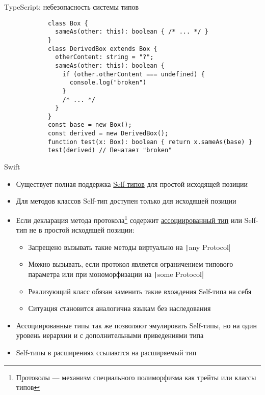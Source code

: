 \documentclass[aspectratio=169,usenames,dvipsnames]{beamer}
\begin{document}
    \begin{frame}[fragile]{TypeScript: небезопасность системы типов}
        \begin{verbatim}
            class Box {
              sameAs(other: this): boolean { /* ... */ }
            }
            class DerivedBox extends Box {
              otherContent: string = "?";
              sameAs(other: this): boolean {
                if (other.otherContent === undefined) {
                  console.log("broken")
                }
                /* ... */
              }
            }
            const base = new Box();
            const derived = new DerivedBox();
            function test(x: Box): boolean { return x.sameAs(base) }
            test(derived) // Печатает "broken"
        \end{verbatim}
    \end{frame}

    \begin{frame}{Swift}
        \begin{itemize}
            \item Существует полная поддержка \href{https://docs.swift.org/swift-book/documentation/the-swift-programming-language/types/\#Self-Type}{\color{blue}Self-типов} для простой исходящей позиции \pause
            \item Для методов классов Self-тип доступен только для исходящей позиции \pause
            \item Если декларация метода протокола\footnote{Протоколы --- механизм специального полиморфизма как трейты или классы типов} содержит \href{https://docs.swift.org/swift-book/documentation/the-swift-programming-language/generics/\#Associated-Types}{\color{blue}ассоциированный тип} или Self-тип не в простой исходящей позиции: \pause
            \begin{itemize}
                \item Запрещено вызывать такие методы виртуально на \texttt|any Protocol|
                \item Можно вызывать, если протокол является ограничением типового параметра или при мономорфизации на \texttt|some Protocol|
                \item Реализующий класс обязан заменить такие вхождения Self-типа на себя
                \item Ситуация становится аналогична языкам без наследования
            \end{itemize} \pause
            \item Ассоциированные типы так же позволяют эмулировать Self-типы, но на один уровень иерархии и с дополнительными приведениями типа \pause
            \item Self-типы в расширениях ссылаются на расширяемый тип
        \end{itemize}
    \end{frame}
\end{document}

